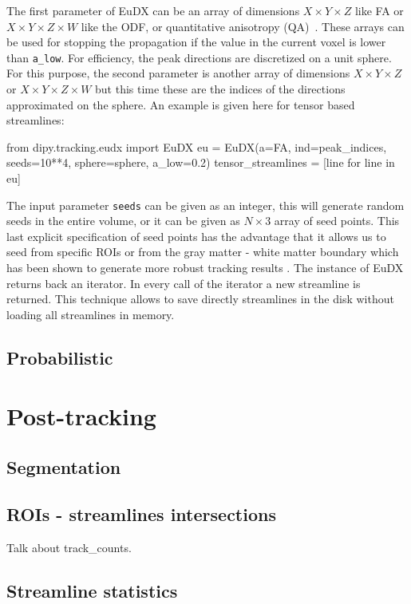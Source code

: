 \documentclass{bioinfo}
\begin{document}
The first parameter of EuDX can be an array of dimensions $X\times Y\times Z$ like FA or $X\times Y\times Z \times W$ like the ODF, or quantitative anisotropy (QA)~\citep{yeh-etal:10}. These arrays can be used for stopping the propagation if the value in the current voxel is lower than \texttt{a\_low}. For efficiency, the peak directions are discretized on a unit sphere. For this purpose, the second parameter is another array of dimensions $X\times Y\times Z$ or $X\times Y\times Z\times W$ but this time these are the indices of the directions approximated on the sphere. An example is given here for tensor based streamlines:
\begin{python}
from dipy.tracking.eudx import EuDX
eu = EuDX(a=FA, ind=peak_indices, seeds=10**4,
          sphere=sphere, a_low=0.2)
tensor_streamlines = [line for line in eu]
\end{python}
The input parameter \texttt{seeds} can be given as an integer, this will generate random seeds in the entire volume, or it can be given as $N\times 3$ array of seed points. This last explicit specification of seed points has the advantage that it allows us to seed from specific ROIs or from the gray matter - white matter boundary which has been shown to generate more robust tracking results \citep{Cote2013tractometer}. The instance of EuDX returns back an iterator. In every call of the iterator a new streamline is returned. This technique allows to save directly streamlines in the disk without loading all streamlines in memory.

\subsection{Probabilistic}

\section{Post-tracking}

\subsection{Segmentation}

\subsection{ROIs - streamlines intersections}

Talk about track\_counts.

\subsection{Streamline statistics}
\end{document}
